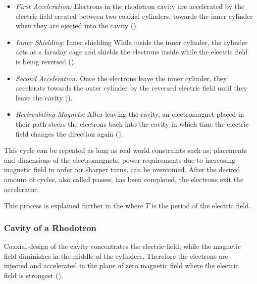 \documentclass[a4paper,oneside,12pt]{report}
\numberwithin{equation}{chapter}
\begin{document}
\begin{itemize}
    \item \textit{First Acceleration:} Electrons in the rhodotron cavity are accelerated by the electric field created between two coaxial cylinders, towards the inner cylinder when they are ejected into the cavity ().
    \item \textit{Inner Shielding:} Inner shielding While inside the inner cylinder, the cylinder acts as a faraday cage and shields the electrons inside while the electric field is being reversed (). 
    \item \textit{Second Acceleration:} Once the electrons leave the inner cylinder, they accelerate towards the outer cylinder by the reversed electric field until they leave the cavity (). 
    \item \textit{Recirculating Magnets:} After leaving the cavity, an electromagnet placed in their path steers the electrons back into the cavity in which time the electric field changes the direction again (). 
\end{itemize}

This cycle can be repeated as long as real world constraints such as; placements and dimensions of the electromagnets, power requirements due to increasing magnetic field in order for sharper turns, can be overcomed.
After the desired amount of cycles, also called passes, has been completed, the electrons exit the accelerator.

This process is explained further in the  where $T$ is the period of the electric field.

\subsubsection{Cavity of a Rhodotron} \label{sec:cavity_of_a_rhodotron}

Coaxial design of the cavity concentrates the electric field, while the magnetic field diminishes in the middle of the cylinders. 
Therefore the electrons are injected and accelerated in the plane of zero magnetic field where the electric field is strongest ().
\end{document}

